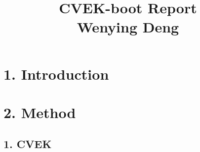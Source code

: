 \documentclass[11pt]{article}
\begin{document}
\setlength{\parindent}{0pt}

\title{CVEK-boot Report\\Wenying Deng \vspace{-1ex}}

\pretitle{\begin{flushright}\normalsize}
\posttitle{\par\end{flushright}}
\author{}
\date{}
\vspace{-10em}
\maketitle
\vspace{-8em}

\vspace{2em}
\section*{{\bf 1. Introduction}}
\section*{{\bf 2. Method}}
\subsection*{{1. CVEK}}
\setcounter{equation}{0}
\renewcommand{\theequation}{2.1.\arabic{equation}}
\end{document}
